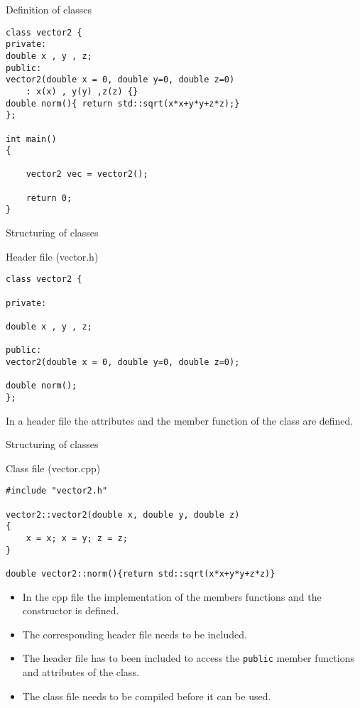 \documentclass[12pt,t]{beamer}
\begin{document}
\begin{frame}[fragile]{Definition of classes}
\begin{lstlisting}
class vector2 {
private:
double x , y , z;
public:
vector2(double x = 0, double y=0, double z=0)
	: x(x) , y(y) ,z(z) {}
double norm(){ return std::sqrt(x*x+y*y+z*z);}
};

int main()
{
   
    vector2 vec = vector2();

    return 0;
}
\end{lstlisting}
\end{frame}

\begin{frame}[fragile]{Structuring of classes}

\begin{block}{Header file (vector.h)}
\begin{lstlisting}
class vector2 {

private:

double x , y , z;

public:
vector2(double x = 0, double y=0, double z=0);

double norm();
};
\end{lstlisting}
\end{block}
In a header file the attributes and the member function of the class are defined.
\end{frame}


\begin{frame}[fragile]{Structuring of classes}

\begin{block}{Class file (vector.cpp)}
\begin{lstlisting}
#include "vector2.h"

vector2::vector2(double x, double y, double z)
{
    x = x; x = y; z = z;
}

double vector2::norm(){return std::sqrt(x*x+y*y+z*z)}
\end{lstlisting}
\end{block}
\begin{itemize}
\item In the cpp file the implementation of the members functions and the constructor is defined.
\item The corresponding header file needs to be included.
\item The header file has to been included to access the \lstinline|public| member functions and attributes of the class.
\item The class file needs to be compiled before it can be used.
\end{itemize}

\end{frame}
\end{document}
